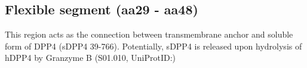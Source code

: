 \subsection{Flexible segment (aa29 - aa48)}

This region acts as the connection between transmembrane anchor and soluble form of DPP4 (sDPP4 39-766). Potentially, sDPP4 is released upon hydrolysis of hDPP4 by Granzyme B (S01.010, UniProtID:)
